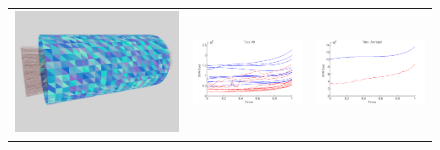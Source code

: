 \documentclass[twocolumn]{article}
\begin{document}
\begin{figure}
\begin{tabular}{|c|c|c|}
\\
\hline
\includegraphics[scale=.2]{tube_demo.png}
&\includegraphics[scale=.35]{tube_all.png}
&\includegraphics[scale=.35]{tube_average.png} 
\end{tabular}
\end{figure}
\end{document}
